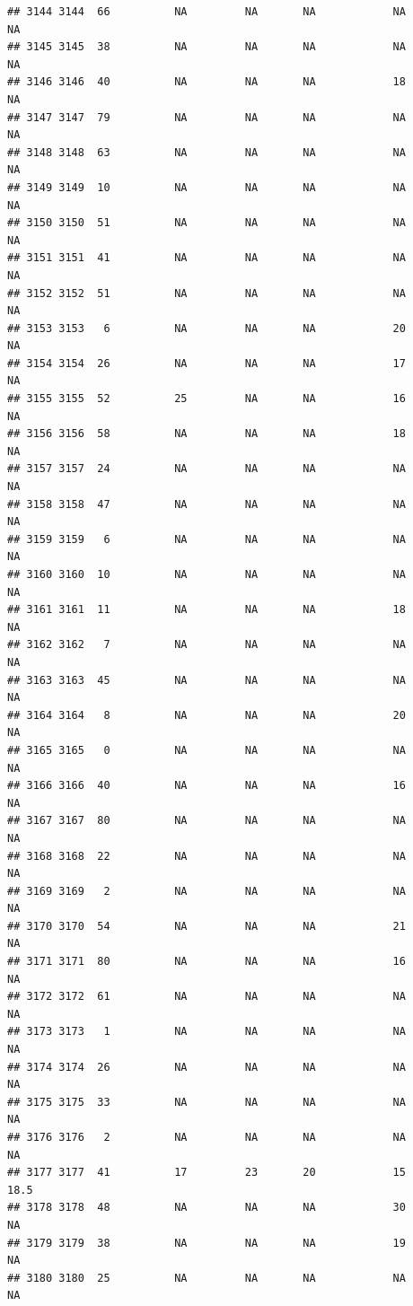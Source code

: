 \documentclass[man]{apa6}
\begin{document}
\begin{verbatim}
## 3144 3144  66          NA         NA       NA            NA       NA
## 3145 3145  38          NA         NA       NA            NA       NA
## 3146 3146  40          NA         NA       NA            18       NA
## 3147 3147  79          NA         NA       NA            NA       NA
## 3148 3148  63          NA         NA       NA            NA       NA
## 3149 3149  10          NA         NA       NA            NA       NA
## 3150 3150  51          NA         NA       NA            NA       NA
## 3151 3151  41          NA         NA       NA            NA       NA
## 3152 3152  51          NA         NA       NA            NA       NA
## 3153 3153   6          NA         NA       NA            20       NA
## 3154 3154  26          NA         NA       NA            17       NA
## 3155 3155  52          25         NA       NA            16       NA
## 3156 3156  58          NA         NA       NA            18       NA
## 3157 3157  24          NA         NA       NA            NA       NA
## 3158 3158  47          NA         NA       NA            NA       NA
## 3159 3159   6          NA         NA       NA            NA       NA
## 3160 3160  10          NA         NA       NA            NA       NA
## 3161 3161  11          NA         NA       NA            18       NA
## 3162 3162   7          NA         NA       NA            NA       NA
## 3163 3163  45          NA         NA       NA            NA       NA
## 3164 3164   8          NA         NA       NA            20       NA
## 3165 3165   0          NA         NA       NA            NA       NA
## 3166 3166  40          NA         NA       NA            16       NA
## 3167 3167  80          NA         NA       NA            NA       NA
## 3168 3168  22          NA         NA       NA            NA       NA
## 3169 3169   2          NA         NA       NA            NA       NA
## 3170 3170  54          NA         NA       NA            21       NA
## 3171 3171  80          NA         NA       NA            16       NA
## 3172 3172  61          NA         NA       NA            NA       NA
## 3173 3173   1          NA         NA       NA            NA       NA
## 3174 3174  26          NA         NA       NA            NA       NA
## 3175 3175  33          NA         NA       NA            NA       NA
## 3176 3176   2          NA         NA       NA            NA       NA
## 3177 3177  41          17         23       20            15     18.5
## 3178 3178  48          NA         NA       NA            30       NA
## 3179 3179  38          NA         NA       NA            19       NA
## 3180 3180  25          NA         NA       NA            NA       NA

\end{verbatim}
\end{document}
